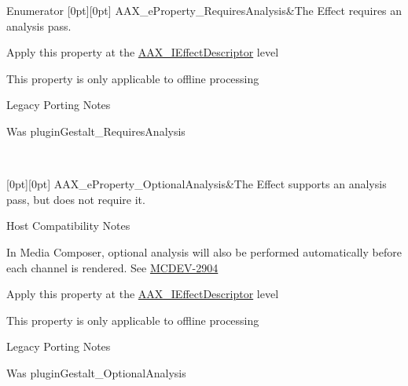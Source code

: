 \begin{DoxyEnumFields}{Enumerator}
[0pt][0pt]{}\mbox{\label{a00662_a13e384f22825afd3db6d68395b79ce0da925c49bb79454b33bf1d5f4cb09d373f}} 
A\+A\+X\+\_\+e\+Property\+\_\+\+Requires\+Analysis&The Effect requires an analysis pass. \begin{DoxyItemize}
\item Apply this property at the \mbox{\hyperlink{a01813}{A\+A\+X\+\_\+\+I\+Effect\+Descriptor}} level \item This property is only applicable to offline processing\end{DoxyItemize}
\begin{DoxyRefDesc}{Legacy Porting Notes}
\item[\mbox{\hyperlink{a00787__porting_notes000048}{Legacy Porting Notes}}]Was plugin\+Gestalt\+\_\+\+Requires\+Analysis \end{DoxyRefDesc}
\\
\hline

[0pt][0pt]{}\mbox{\label{a00662_a13e384f22825afd3db6d68395b79ce0da5a2bacb421fc36f890a121f01a9e72ba}} 
A\+A\+X\+\_\+e\+Property\+\_\+\+Optional\+Analysis&The Effect supports an analysis pass, but does not require it. \begin{DoxyRefDesc}{Host Compatibility Notes}
\item[\mbox{\hyperlink{a00786__compatibility_notes000068}{Host Compatibility Notes}}]In Media Composer, optional analysis will also be performed automatically before each channel is rendered. See \mbox{\hyperlink{a00846_MCDEV-2904}{M\+C\+D\+E\+V-\/2904}}\end{DoxyRefDesc}


\begin{DoxyItemize}
\item Apply this property at the \mbox{\hyperlink{a01813}{A\+A\+X\+\_\+\+I\+Effect\+Descriptor}} level \item This property is only applicable to offline processing\end{DoxyItemize}
\begin{DoxyRefDesc}{Legacy Porting Notes}
\item[\mbox{\hyperlink{a00787__porting_notes000049}{Legacy Porting Notes}}]Was plugin\+Gestalt\+\_\+\+Optional\+Analysis \end{DoxyRefDesc}
\\
\hline


\end{DoxyEnumFields}
